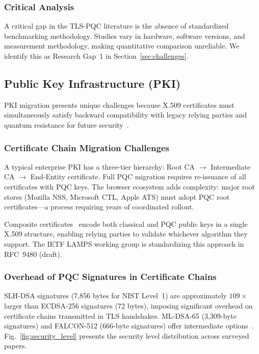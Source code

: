 \documentclass[journal]{IEEEtran}
\begin{document}
\subsubsection{Critical Analysis}

A critical gap in the TLS-PQC literature is the absence of standardized
benchmarking methodology. Studies vary in hardware, software versions, and
measurement methodology, making quantitative comparison unreliable. We identify
this as Research Gap~1 in Section~\ref{sec:challenges}.

\subsection{Public Key Infrastructure (PKI)}
\label{sec:pki}

PKI migration presents unique challenges because X.509 certificates must
simultaneously satisfy backward compatibility with legacy relying parties
and quantum resistance for future security~\cite{ott2019identifying}.

\subsubsection{Certificate Chain Migration Challenges}

A typical enterprise PKI has a three-tier hierarchy: Root CA $\to$ Intermediate
CA $\to$ End-Entity certificate. Full PQC migration requires re-issuance of
all certificates with PQC keys. The browser ecosystem adds complexity: major
root stores (Mozilla NSS, Microsoft CTL, Apple ATS) must adopt PQC root
certificates---a process requiring years of coordinated rollout.

Composite certificates~\cite{bindel2017hybrid} encode both classical and PQC
public keys in a single X.509 structure, enabling relying parties to validate
whichever algorithm they support. The IETF LAMPS working group is standardizing
this approach in RFC~9480 (draft).

\subsubsection{Overhead of PQC Signatures in Certificate Chains}

SLH-DSA signatures (7,856 bytes for NIST Level~1) are approximately $109\times$ larger
than ECDSA-256 signatures (72 bytes), imposing significant overhead on
certificate chains transmitted in TLS handshakes. ML-DSA-65 (3,309-byte
signatures) and FALCON-512 (666-byte signatures) offer intermediate
options~\cite{kampanakis2021pki}. Fig.~\ref{fig:security_level} presents
the security level distribution across surveyed papers.
\end{document}
